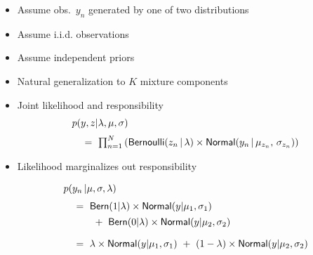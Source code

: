\documentclass[10pt]{report}
\begin{document}
\begin{itemize}
\item Assume obs.\ $y_n$ generated by one of two distributions
\item Assume i.i.d. observations
\item Assume independent priors
\begin{subsubitemize}
\item $\lambda \sim \ldots$ \hfill $\sigma \sim \ldots$ \hfill $\mu
  \sim \ldots$ \hfill \mbox{ }
\end{subsubitemize}
\item Natural generalization to $K$ mixture components
\end{itemize}

\begin{itemize}
\item Joint likelihood and responsibility
{\small
\[
\begin{array}{l}
p(y,z|\lambda,\mu,\sigma) 
\\[6pt]
\mbox{ } \ \ = \ \prod_{n=1}^N \left( 
                 \text{\sf Bernoulli}(z_n \, | \, \lambda) 
                 \times \text{\sf Normal}(y_n \, | \, \mu_{z_n}, \, \sigma_{z_n})
               \right)
\end{array}
\]
}
\item Likelihood marginalizes out responsibility
{\small
\[
\begin{array}{l}
p(y_n \, | \mu, \sigma, \lambda) 
\\[6pt]
\mbox{ } \ \ = \ \text{\sf Bern}(1|\lambda) \times \text{\sf Normal}(y|\mu_1, \sigma_1)
\\[4pt]
\mbox{ } \ \ \ \ \ \ \ \ + \ \text{\sf Bern}(0|\lambda) \times \text{\sf Normal}(y|\mu_2, \sigma_2)
\\[10pt]
\mbox{ } \ \ = \ \lambda \times \text{\sf Normal}(y|\mu_1, \sigma_1)
\ + \ (1 - \lambda) \times \text{\sf Normal}(y|\mu_2, \sigma_2)
\end{array}
\]
}
\end{itemize}
\end{document}
